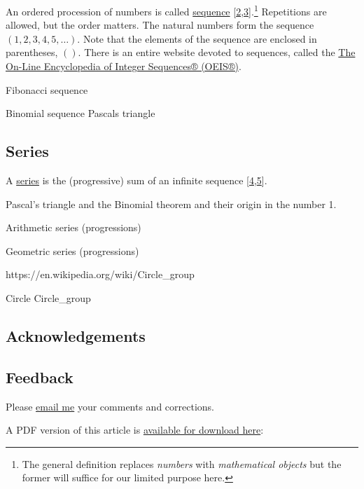 \documentclass[
  a4paper,
]{article}
\begin{document}
An ordered procession of numbers is called
\href{https://en.wikipedia.org/w/index.php?title=Sequence\&oldid=1177801065}{sequence}
{[}\protect\hyperlink{ref-wikisequence}{2},\protect\hyperlink{ref-wolframsequence}{3}{]}.\footnote{The
  general definition replaces \emph{numbers} with \emph{mathematical
  objects} but the former will suffice for our limited purpose here.}
Repetitions are allowed, but the order matters. The natural numbers form
the sequence \((1, 2, 3, 4, 5, \ldots)\). Note that the elements of the
sequence are enclosed in parentheses, \(()\). There is an entire website
devoted to sequences, called the \href{https://oeis.org/}{The On-Line
Encyclopedia of Integer Sequences® (OEIS®)}.

Fibonacci sequence

Binomial sequence Pascals triangle

\hypertarget{series}{%
\subsection{Series}\label{series}}

A \href{https://mathworld.wolfram.com/Series.html}{series} is the
(progressive) sum of an infinite sequence
{[}\protect\hyperlink{ref-wikiseries}{4},\protect\hyperlink{ref-wolframseries}{5}{]}.

Pascal's triangle and the Binomial theorem and their origin in the
number 1.

Arithmetic series (progressions)

Geometric series (progressions)

https://en.wikipedia.org/wiki/Circle\_group

Circle Circle\_group

\hypertarget{acknowledgements}{%
\subsection{Acknowledgements}\label{acknowledgements}}

\hypertarget{feedback}{%
\subsection{Feedback}\label{feedback}}

Please \href{mailto:feedback.swanlotus@gmail.com}{email me} your
comments and corrections.

\noindent A PDF version of this article is
\href{./the-two-most-important-numbers.pdf}{available for download
here}:
\end{document}
